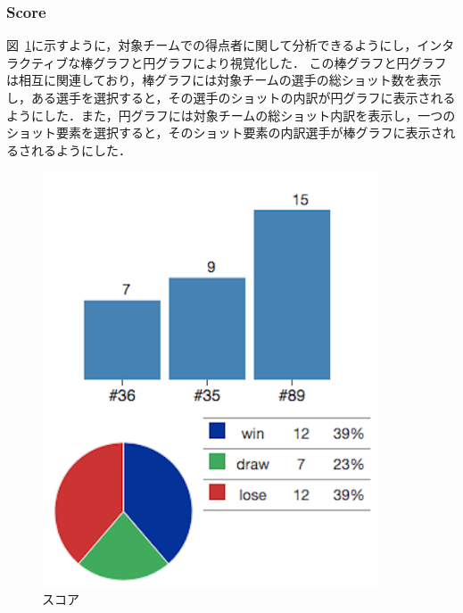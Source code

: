 \documentclass[sotsuron]{kuee}
\begin{document}
			\subsubsection{Score}
				図~\ref{fig:score}に示すように，対象チームでの得点者に関して分析できるようにし，インタラクティブな棒グラフと円グラフにより視覚化した．
				この棒グラフと円グラフは相互に関連しており，棒グラフには対象チームの選手の総ショット数を表示し，ある選手を選択すると，その選手のショットの内訳が円グラフに表示されるようにした．また，円グラフには対象チームの総ショット内訳を表示し，一つのショット要素を選択すると，そのショット要素の内訳選手が棒グラフに表示されるされるようにした．
					\begin{figure}
						\begin{center}
							\includegraphics[width=10cm]{./png/score.png}
						\end{center}
						\caption{スコア}
				  		\label{fig:score}
					\end{figure}
\end{document}
